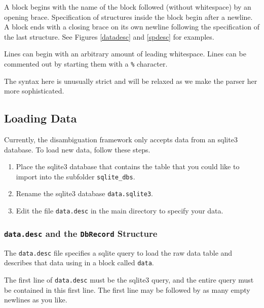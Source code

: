 \documentclass[10pt, letterpaper]{article}
\begin{document}
A block begins with the name of the block followed (without whitespace) by an opening brace.
Specification of structures inside the block begin after a newline. A block ends with a closing
brace on its own newline following the specification of the last structure. See Figures \ref{datadesc}
and \ref{spdesc} for examples.

Lines can begin with an arbitrary amount of leading whitespace.
Lines can be commented out by starting them with a \texttt{\%} character.

The syntax here is unusually strict and will be relaxed as we make the parser her more sophisticated.
\subsection{Loading Data}
Currently, the disambiguation framework only accepts data from an sqlite3 database.
To load new data, follow these steps.
\begin{enumerate}
\item Place the sqlite3 database that contains the table that you could like to import
      into the subfolder \texttt{sqlite\_dbs}.
\item Rename the sqlite3 database \texttt{data.sqlite3}.
\item Edit the file \texttt{data.desc} in the main directory to specify your data.
\end{enumerate}
\subsubsection{\texttt{data.desc} and the \texttt{DbRecord} Structure}
The \texttt{data.desc} file specifies a sqlite query to load the raw data table and describes
that data using in a block called \texttt{data}.

The first line of \texttt{data.desc} must be the sqlite3 query, and the entire query must be contained in this first line. The first line may be followed by as many empty newlines as you like.
\end{document}
